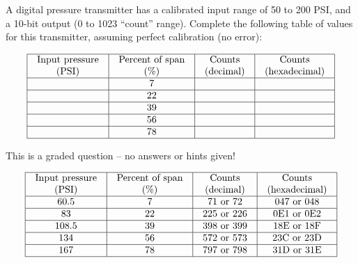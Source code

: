 

A digital pressure transmitter has a calibrated input range of 50 to 200 PSI, and a 10-bit output (0 to 1023 ``count'' range).  Complete the following table of values for this transmitter, assuming perfect calibration (no error):


$$\vbox{\offinterlineskip
\halign{\strut
\vrule \quad\hfil # \ \hfil & 
\vrule \quad\hfil # \ \hfil & 
\vrule \quad\hfil # \ \hfil & 
\vrule \quad\hfil # \ \hfil \vrule \cr
\noalign{\hrule}
%
Input pressure & Percent of span & Counts & Counts \cr
%
(PSI) & (\%) & (decimal) & (hexadecimal) \cr
%
\noalign{\hrule}
%
 & 7 &  &  \cr
%
\noalign{\hrule}
%
 & 22 &  &  \cr
%
\noalign{\hrule}
%
 & 39 &  &  \cr
%
\noalign{\hrule}
%
 & 56 &  &  \cr
%
\noalign{\hrule}
%
 & 78 &  &  \cr
%
\noalign{\hrule}
} %
}$$ %

\vfil 

\eject






This is a graded question -- no answers or hints given!








$$\vbox{\offinterlineskip
\halign{\strut
\vrule \quad\hfil # \ \hfil & 
\vrule \quad\hfil # \ \hfil & 
\vrule \quad\hfil # \ \hfil & 
\vrule \quad\hfil # \ \hfil \vrule \cr
\noalign{\hrule}
%
Input pressure & Percent of span & Counts & Counts \cr
%
(PSI) & (\%) & (decimal) & (hexadecimal) \cr
%
\noalign{\hrule}
%
60.5 & 7 & 71 or 72 & 047 or 048 \cr
%
\noalign{\hrule}
%
83 & 22 & 225 or 226 & 0E1 or 0E2 \cr
%
\noalign{\hrule}
%
108.5 & 39 & 398 or 399 & 18E or 18F \cr
%
\noalign{\hrule}
%
134 & 56 & 572 or 573 & 23C or 23D \cr
%
\noalign{\hrule}
%
167 & 78 & 797 or 798 & 31D or 31E \cr
%
\noalign{\hrule}
} %
}$$ %




